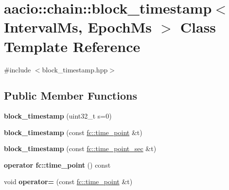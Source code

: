 \hypertarget{classaacio_1_1chain_1_1block__timestamp}{}\section{aacio\+:\+:chain\+:\+:block\+\_\+timestamp$<$ Interval\+Ms, Epoch\+Ms $>$ Class Template Reference}
\label{classaacio_1_1chain_1_1block__timestamp}


{\ttfamily \#include $<$block\+\_\+timestamp.\+hpp$>$}

\subsection*{Public Member Functions}
\begin{DoxyCompactItemize}
\item 
\mbox{\label{classaacio_1_1chain_1_1block__timestamp_af5fb4bc2c652ab76426180162ae8edc2}} 
{\bfseries block\+\_\+timestamp} (uint32\+\_\+t s=0)
\item 
\mbox{\label{classaacio_1_1chain_1_1block__timestamp_af98d6fc3327dced3f2896a972fcbb998}} 
{\bfseries block\+\_\+timestamp} (const \mbox{\hyperlink{classfc_1_1time__point}{fc\+::time\+\_\+point}} \&t)
\item 
\mbox{\label{classaacio_1_1chain_1_1block__timestamp_a1e1dbf21d9aba4711075be268c682912}} 
{\bfseries block\+\_\+timestamp} (const \mbox{\hyperlink{classfc_1_1time__point__sec}{fc\+::time\+\_\+point\+\_\+sec}} \&t)
\item 
\mbox{\label{classaacio_1_1chain_1_1block__timestamp_a7b527c48ab92405194885e31e6238f42}} 
{\bfseries operator fc\+::time\+\_\+point} () const
\item 
\mbox{\label{classaacio_1_1chain_1_1block__timestamp_aaadafc52a1f7fd1215cb7ab155d812e8}} 
void {\bfseries operator=} (const \mbox{\hyperlink{classfc_1_1time__point}{fc\+::time\+\_\+point}} \&t)
\item 
\mbox{\label{classaacio_1_1chain_1_1block__timestamp_a222d914ccb7eb71594d6f606ca9e18ea}} 

\end{DoxyCompactItemize}

